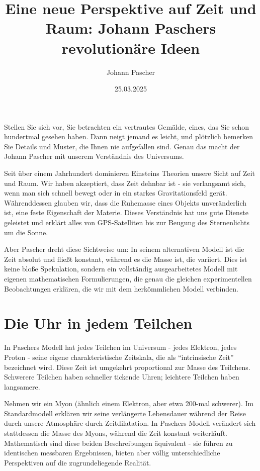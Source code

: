 \documentclass[a4paper,12pt]{article}
\title{Eine neue Perspektive auf Zeit und Raum: Johann Paschers revolutionäre Ideen}
\author{Johann Pascher}
\date{25.03.2025}
\begin{document}
	\maketitle
	
	Stellen Sie sich vor, Sie betrachten ein vertrautes Gemälde, eines, das Sie schon hundertmal gesehen haben. Dann neigt jemand es leicht, und plötzlich bemerken Sie Details und Muster, die Ihnen nie aufgefallen sind. Genau das macht der Johann Pascher mit unserem Verständnis des Universums.
	
	Seit über einem Jahrhundert dominieren Einsteins Theorien unsere Sicht auf Zeit und Raum. Wir haben akzeptiert, dass Zeit dehnbar ist - sie verlangsamt sich, wenn man sich schnell bewegt oder in ein starkes Gravitationsfeld gerät. Währenddessen glauben wir, dass die Ruhemasse eines Objekts unveränderlich ist, eine feste Eigenschaft der Materie. Dieses Verständnis hat uns gute Dienste geleistet und erklärt alles von GPS-Satelliten bis zur Beugung des Sternenlichts um die Sonne.
	
	Aber Pascher dreht diese Sichtweise um: In seinem alternativen Modell ist die Zeit absolut und fließt konstant, während es die Masse ist, die variiert. Dies ist keine bloße Spekulation, sondern ein vollständig ausgearbeitetes Modell mit eigenen mathematischen Formulierungen, die genau die gleichen experimentellen Beobachtungen erklären, die wir mit dem herkömmlichen Modell verbinden.
	
	\section{Die Uhr in jedem Teilchen}
	
	In Paschers Modell hat jedes Teilchen im Universum - jedes Elektron, jedes Proton - seine eigene charakteristische Zeitskala, die als ``intrinsische Zeit'' bezeichnet wird. Diese Zeit ist umgekehrt proportional zur Masse des Teilchens. Schwerere Teilchen haben schneller tickende Uhren; leichtere Teilchen haben langsamere.
	
	Nehmen wir ein Myon (ähnlich einem Elektron, aber etwa 200-mal schwerer). Im Standardmodell erklären wir seine verlängerte Lebensdauer während der Reise durch unsere Atmosphäre durch Zeitdilatation. In Paschers Modell verändert sich stattdessen die Masse des Myons, während die Zeit konstant weiterläuft. Mathematisch sind diese beiden Beschreibungen äquivalent - sie führen zu identischen messbaren Ergebnissen, bieten aber völlig unterschiedliche Perspektiven auf die zugrundeliegende Realität.
	
\end{document}
